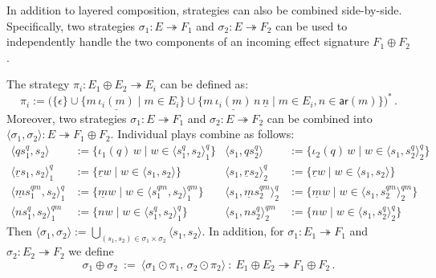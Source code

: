 \documentclass[acmsmall,screen,review,nonacm]{acmart}
\newcommand{\kw}[1]{\ensuremath{ \mathsf{#1} }}
\begin{document}
In addition to layered composition,
strategies can also be combined side-by-side.
Specifically, two strategies
$\sigma_1 : E \twoheadrightarrow F_1$ and
$\sigma_2 : E \twoheadrightarrow F_2$
can be used to independently handle
the two components of an incoming effect signature $F_1 \oplus F_2$.

\begin{definition} %
The strategy $\pi_i : E_1 \oplus E_2 \twoheadrightarrow E_i$
can be defined as:
\[
  \pi_i := \bigl(
    \{ \epsilon \} \cup
    \{ m \, \underline{\iota_i(m)} \mid m \in E_i \} \cup
    \{ m \, \underline{\iota_i(m)} \, n \, \underline{n} \mid
       m \in E_i, n \in \kw{ar}(m) \}
  \big)^*
  \,.
\]
Moreover,
two strategies
$\sigma_1 : E \twoheadrightarrow F_1$ and
$\sigma_2 : E \twoheadrightarrow F_2$
can be combined into
$\langle \sigma_1, \sigma_2 \rangle : E \twoheadrightarrow F_1 \oplus F_2$.
Individual plays combine as follows:
\begin{align*}
  \langle qs_1^q , s_2 \rangle &:=
    \{ \iota_1(q) \, w \mid w \in \langle s_1^q, s_2 \rangle^q_1 \} &
  \langle s_1 , qs_2^q \rangle &:=
    \{ \iota_2(q) \, w \mid w \in \langle s_1, s_2^q \rangle^q_2 \}
  \\
  \langle \underline{r} s_1, s_2 \rangle_1^q &:=
    \{ \underline{r} w \mid w \in \langle s_1, s_2 \rangle \} &
  \langle s_1, \underline{r} s_2 \rangle_2^q &:=
    \{ \underline{r} w \mid w \in \langle s_1, s_2 \rangle \}
  \\
  \langle \underline{m} s_1^{qm}, s_2 \rangle_1^q &:=
    \{ \underline{m} w \mid w \in \langle s_1^{qm}, s_2 \rangle^{qm}_1 \} &
  \langle s_1, \underline{m} s_2^{qm} \rangle_2^q &:=
    \{ \underline{m} w \mid w \in \langle s_1, s_2^{qm} \rangle^{qm}_2 \}
  \\
  \langle n s_1^q, s_2 \rangle^{qm}_1 &:=
    \{ n w \mid w \in \langle s_1^q, s_2 \rangle^q_1 \} &
  \langle s_1, n s_2^q \rangle^{qm}_2 &:=
    \{ n w \mid w \in \langle s_1, s_2^q \rangle^q_2 \}
\end{align*}
Then
$\langle \sigma_1, \sigma_2 \rangle :=
 \bigcup_{(s_1, s_2) \in \sigma_1 \times \sigma_2}
   \langle s_1, s_2 \rangle$.
In addition,
for $\sigma_1 : E_1 \twoheadrightarrow F_1$ and
$\sigma_2 : E_2 \twoheadrightarrow F_2$
we define
\[
  \sigma_1 \oplus \sigma_2 \: := \:
    \langle \sigma_1 \odot \pi_1, \, \sigma_2 \odot \pi_2 \rangle
    \: : \:
    E_1 \oplus E_2 \twoheadrightarrow F_1 \oplus F_2
  \,.
\]
\end{definition}
\end{document}
